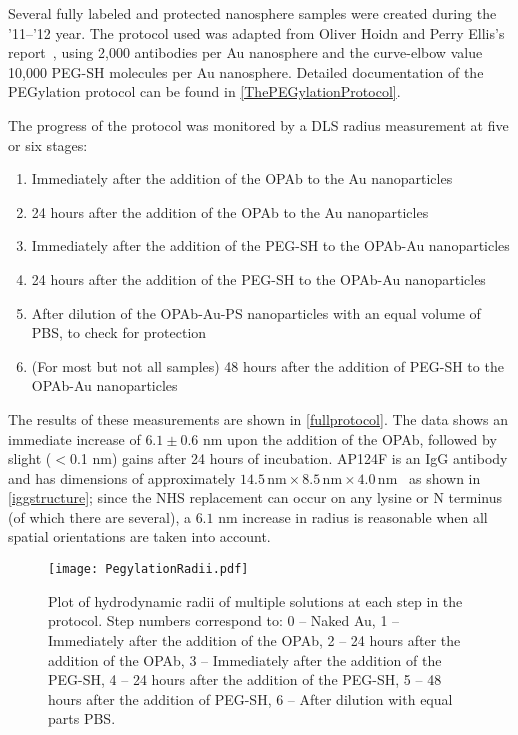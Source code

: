 Several fully labeled and protected nanosphere samples were created during the '11--'12 year. The protocol used was adapted from Oliver Hoidn and Perry Ellis's report~\citep{hoidnellis}, using 2,000 antibodies per Au nanosphere and the curve-elbow value 10,000 PEG-SH molecules per Au nanosphere. Detailed documentation of the PEGylation protocol can be found in \autoref{ThePEGylationProtocol}.

The progress of the protocol was monitored by a DLS radius measurement at five or six stages:

\begin{enumerate}
\item Immediately after the addition of the OPAb to the Au nanoparticles

\item 24 hours after the addition of the OPAb to the Au nanoparticles

\item Immediately after the addition of the PEG-SH to the OPAb-Au nanoparticles

\item 24 hours after the addition of the PEG-SH to the OPAb-Au nanoparticles

\item After dilution of the OPAb-Au-PS nanoparticles with an equal volume of PBS, to check for protection

\item (For most but not all samples) 48 hours after the addition of PEG-SH to the OPAb-Au nanoparticles

\end{enumerate}

The results of these measurements are shown in \autoref{fullprotocol}. The data shows an immediate increase of $6.1\pm0.6$ nm upon the addition of the OPAb, followed by slight ($<$0.1 nm) gains after 24 hours of incubation. AP124F is an IgG antibody and has dimensions of approximately $14.5\mathrm{\,nm}\times8.5\mathrm{\,nm}\times4.0\mathrm{\,nm}$~\citep{antibodylength} as shown in \autoref{iggstructure};
since the NHS replacement can occur on any lysine or N terminus (of which there are several), a $6.1$ nm increase in radius is reasonable when all spatial orientations are taken into account.

\begin{figure}[htbp]
\centering
\texttt{[image: PegylationRadii.pdf]}
\caption{Plot of hydrodynamic radii of multiple solutions at each step in the protocol. Step numbers correspond to: 0 -- Naked Au, 1 -- Immediately after the addition of the OPAb, 2 -- 24 hours after the addition of the OPAb, 3 -- Immediately after the addition of the PEG-SH, 4 -- 24 hours after the addition of the PEG-SH, 5 -- 48 hours after the addition of PEG-SH, 6 -- After dilution with equal parts PBS.}
\label{fullprotocol}
\end{figure}



